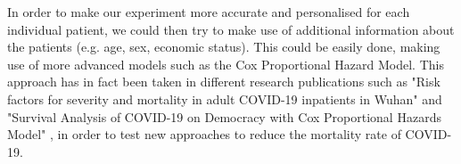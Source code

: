 In order to make our experiment more accurate and personalised for each individual patient, we could then try to make use of additional information about the patients (e.g. age, sex, economic status). This could be easily done, making use of more advanced models such as the Cox Proportional Hazard Model. This approach has in fact been taken in different research publications such as "Risk factors for severity and mortality in adult COVID-19 inpatients in Wuhan" \cite{surv1} and "Survival Analysis of COVID-19 on Democracy with Cox Proportional Hazards Model" \cite{surv2}, in order to test new approaches to reduce the mortality rate of COVID-19. 